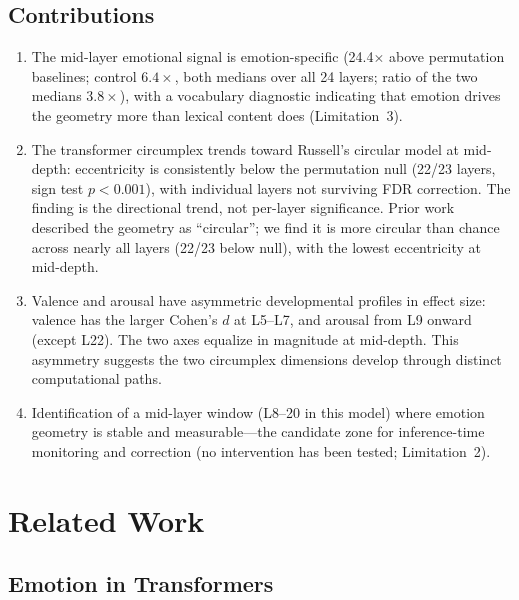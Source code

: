\documentclass[11pt,a4paper]{article}
\begin{document}
\subsection*{Contributions}

\begin{enumerate}[nosep]
    \item The mid-layer emotional signal is emotion-specific
          (24.4$\times$ above permutation baselines; control
          $6.4\times$, both medians over all 24 layers; ratio of the two medians $3.8\times$), with a vocabulary
          diagnostic indicating that emotion drives the geometry more than
          lexical content does (Limitation~3).
    \item The transformer circumplex trends toward Russell's circular
          model at mid-depth: eccentricity is consistently below the
          permutation null (22/23 layers, sign test $p < 0.001$), with
          individual layers not surviving FDR correction. The finding is
          the directional trend, not per-layer significance. Prior work
          \citep{sun2026valence} described the geometry as ``circular'';
          we find it is more circular than chance across nearly all
          layers (22/23 below null), with the lowest eccentricity at
          mid-depth.
    \item Valence and arousal have asymmetric developmental profiles in
          effect size: valence has the larger Cohen's $d$ at L5--L7, and
          arousal from L9 onward (except L22). The two axes equalize in magnitude
          at mid-depth. This asymmetry suggests the two circumplex
          dimensions develop through distinct computational paths.
    \item Identification of a mid-layer window (L8--20 in this model)
          where emotion geometry is stable and measurable---the candidate
          zone for inference-time monitoring and correction (no
          intervention has been tested; Limitation~2).
\end{enumerate}

\section{Related Work}
\label{sec:related}

\subsection{Emotion in Transformers}
\end{document}
